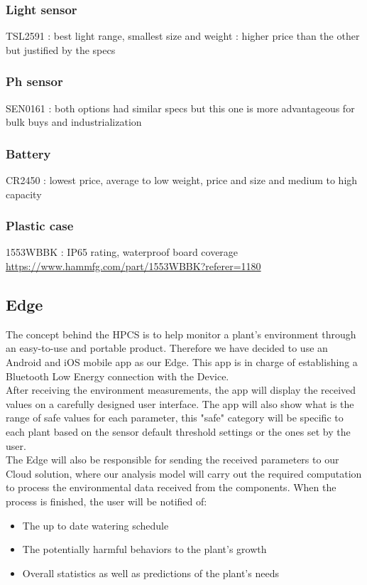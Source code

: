 \subsubsection{Light sensor}
TSL2591 : best light range, smallest size and weight : higher price than the other but justified by the specs
\subsubsection{Ph sensor}
SEN0161 : both options had similar specs but this one is more advantageous for bulk buys and industrialization
\subsubsection{Battery}
CR2450 : lowest price, average to low weight, price and size and medium to high capacity
\subsubsection{Plastic case}
1553WBBK : IP65 rating, waterproof board coverage 
\url{https://www.hammfg.com/part/1553WBBK?referer=1180}

\subsection{Edge}
The concept behind the HPCS is to help monitor a plant's environment through an easy-to-use and portable product. Therefore we have decided to use an Android and iOS mobile app as our Edge. This app is in charge of establishing a Bluetooth Low Energy connection with the Device. \\
After receiving the environment measurements, the app will display the received values on a carefully designed user interface. The app will also show what is the range of safe values for each parameter, this "safe" category will be specific to each plant based on the sensor default threshold settings or the ones set by the user. \\
The Edge will also be responsible for sending the received parameters to our Cloud solution, where our analysis model will carry out the required computation to process the environmental data received from the components. When the process is finished, the user will be notified of:
\begin{itemize}
    \item The up to date watering schedule
    \item The potentially harmful behaviors to the plant's growth
    \item Overall statistics as well as predictions of the plant's needs
\end{itemize}

